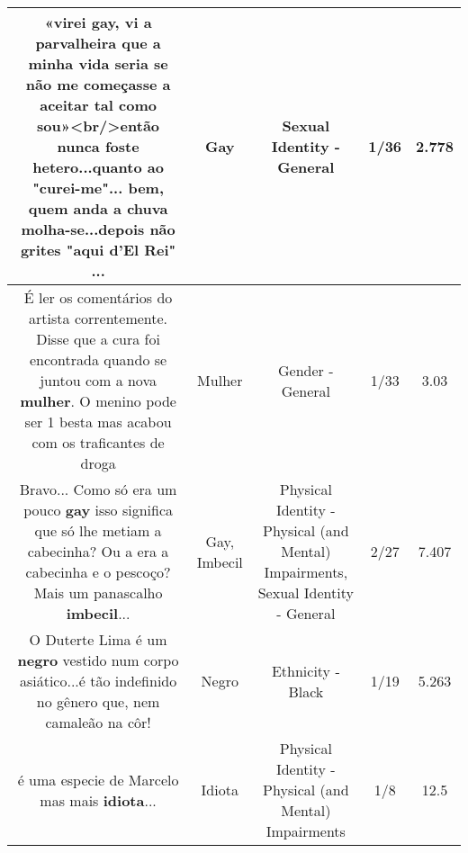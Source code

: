 \documentclass[11pt]{article}
\newlength\mylength
\begin{document}
\begin{center}
\begin{longtable}{|C{.65\mylength}|C{.30\mylength}|C{.12\mylength}|C{.12\mylength}|C{.12\mylength}|}
  \small «virei \textbf{gay}, vi a parvalheira que a minha vida seria se não me começasse a aceitar tal como sou»<br/>então nunca foste hetero...quanto ao "curei-me"... bem, quem anda a chuva molha-se...depois não grites "aqui d'El Rei" ...\normalsize   & Gay & Sexual Identity - General & 1/36 & 2.778 \\  \hline
  \small É  ler os comentários do artista correntemente.  Disse que a cura foi encontrada quando se juntou com a nova \textbf{mulher}. O menino pode ser 1 besta mas acabou com os traficantes de droga\normalsize   & Mulher & Gender - General & 1/33 & 3.03 \\  \hline
  \small Bravo... Como só era um pouco \textbf{gay} isso significa que só lhe metiam a cabecinha? Ou a era a cabecinha e o pescoço? Mais um panascalho \textbf{imbecil}...\normalsize   & Gay, Imbecil & Physical Identity - Physical (and Mental) Impairments, Sexual Identity - General & 2/27 & 7.407 \\  \hline
  \small O Duterte Lima é um \textbf{negro} vestido num corpo asiático...é tão indefinido no gênero que, nem camaleão na côr!\normalsize   & Negro & Ethnicity - Black & 1/19 & 5.263 \\  \hline
  \small é uma especie de Marcelo mas mais \textbf{idiota}...\normalsize   & Idiota & Physical Identity - Physical (and Mental) Impairments & 1/8 & 12.5 \\  \hline
  
\end{longtable}
\end{center}
\end{document}
